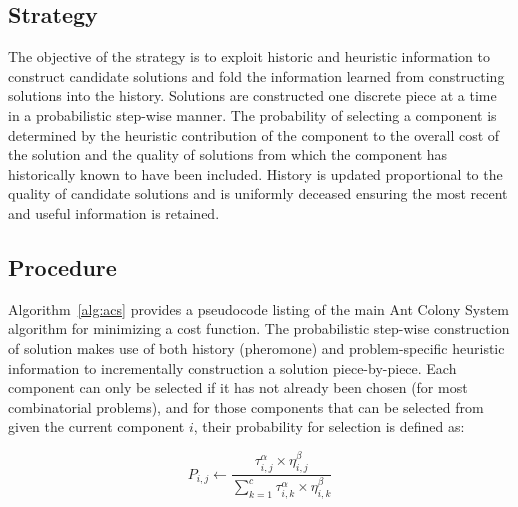 \subsection{Strategy}
The objective of the strategy is to exploit historic and heuristic information to construct candidate solutions and fold the information learned from constructing solutions into the history.
Solutions are constructed one discrete piece at a time in a probabilistic step-wise manner. The probability of selecting a component is determined by the heuristic contribution of the component to the overall cost of the solution and the quality of solutions from which the component has historically known to have been included. History is updated proportional to the quality of candidate solutions and is uniformly deceased ensuring the most recent and useful information is retained.

\subsection{Procedure}
Algorithm~\ref{alg:acs} provides a pseudocode listing of the main Ant Colony System algorithm for minimizing a cost function. 
The probabilistic step-wise construction of solution makes use of both history (pheromone) and problem-specific heuristic information to incrementally construction a solution piece-by-piece. Each component can only be selected if it has not already been chosen (for most combinatorial problems), and for those components that can  be selected from given the current component $i$, their probability for selection is defined as:

\begin{equation}
P_{i,j} \leftarrow \frac{\tau_{i,j}^{\alpha} \times \eta_{i,j}^{\beta}}{\sum_{k=1}^c \tau_{i,k}^{\alpha} \times \eta_{i,k}^{\beta}}
\end{equation}

